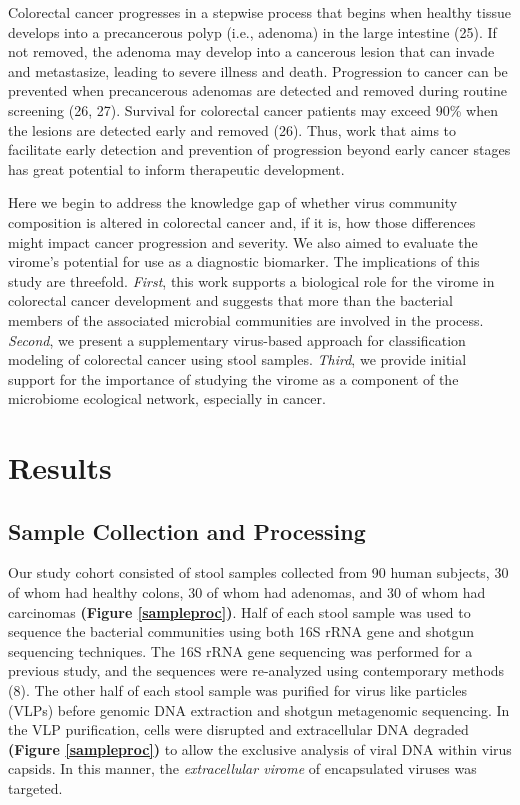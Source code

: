 \documentclass[12pt,]{article}
\begin{document}
Colorectal cancer progresses in a stepwise process that begins when
healthy tissue develops into a precancerous polyp (i.e., adenoma) in the
large intestine (25). If not removed, the adenoma may develop into a
cancerous lesion that can invade and metastasize, leading to severe
illness and death. Progression to cancer can be prevented when
precancerous adenomas are detected and removed during routine screening
(26, 27). Survival for colorectal cancer patients may exceed 90\% when
the lesions are detected early and removed (26). Thus, work that aims to
facilitate early detection and prevention of progression beyond early
cancer stages has great potential to inform therapeutic development.

Here we begin to address the knowledge gap of whether virus community
composition is altered in colorectal cancer and, if it is, how those
differences might impact cancer progression and severity. We also aimed
to evaluate the virome's potential for use as a diagnostic biomarker.
The implications of this study are threefold. \emph{First}, this work
supports a biological role for the virome in colorectal cancer
development and suggests that more than the bacterial members of the
associated microbial communities are involved in the process.
\emph{Second}, we present a supplementary virus-based approach for
classification modeling of colorectal cancer using stool samples.
\emph{Third}, we provide initial support for the importance of studying
the virome as a component of the microbiome ecological network,
especially in cancer.

\section{Results}\label{results}

\subsection{Sample Collection and
Processing}\label{sample-collection-and-processing}

Our study cohort consisted of stool samples collected from 90 human
subjects, 30 of whom had healthy colons, 30 of whom had adenomas, and 30
of whom had carcinomas \textbf{(Figure \ref{sampleproc})}. Half of each
stool sample was used to sequence the bacterial communities using both
16S rRNA gene and shotgun sequencing techniques. The 16S rRNA gene
sequencing was performed for a previous study, and the sequences were
re-analyzed using contemporary methods (8). The other half of each stool
sample was purified for virus like particles (VLPs) before genomic DNA
extraction and shotgun metagenomic sequencing. In the VLP purification,
cells were disrupted and extracellular DNA degraded \textbf{(Figure
\ref{sampleproc})} to allow the exclusive analysis of viral DNA within
virus capsids. In this manner, the \emph{extracellular virome} of
encapsulated viruses was targeted.
\end{document}
